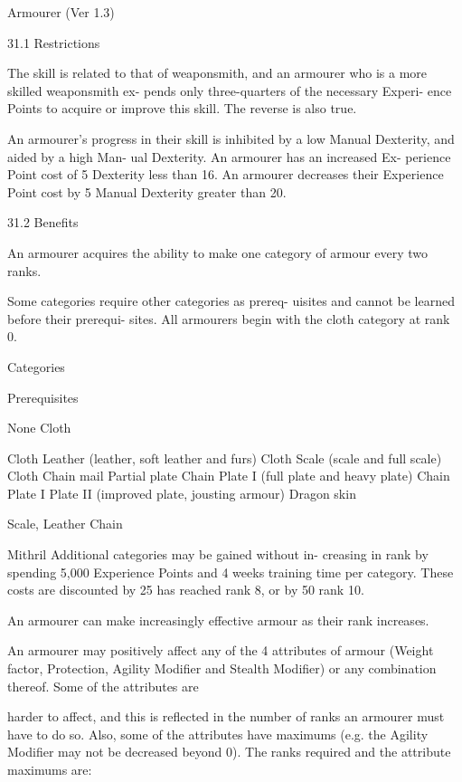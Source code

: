 \begin{Chapter}{Armourer (Ver 1.3)}

31.1 Restrictions 

The skill is related to that of weaponsmith, and an 
armourer  who  is  a  more  skilled  weaponsmith  ex-
pends  only  three-quarters  of  the  necessary  Experi-
ence  Points  to  acquire  or  improve  this  skill.  The 
reverse is also true. 

An armourer’s progress in their skill is inhibited by 
a low Manual Dexterity, and aided by a high Man-
ual  Dexterity.  An  armourer  has  an  increased  Ex-
perience Point cost of 5%
Dexterity less than 16. An armourer decreases their 
Experience  Point  cost  by  5%
Manual Dexterity greater than 20. 

31.2 Benefits 

An  armourer  acquires  the  ability  to  make  one 
category of armour every two ranks. 

Some categories require other categories as prereq-
uisites and cannot be learned before their prerequi-
sites.  All  armourers  begin  with  the  cloth  category 
at rank 0. 

Categories 

Prerequisites 

None  
Cloth  

Cloth 
Leather (leather, soft leather and 
furs) 
Cloth  
Scale (scale and full scale) 
Cloth  
Chain mail 
Partial plate 
Chain  
Plate I (full plate and heavy plate)  Chain  
Plate I 
Plate II (improved plate, jousting 
armour) 
Dragon skin 

Scale, 
Leather 
Chain 

Mithril 
Additional  categories  may  be  gained  without  in-
creasing  in  rank  by  spending  5,000  Experience 
Points  and  4  weeks  training  time  per  category. 
These costs are discounted by 25%
has reached rank 8, or by 50%
rank 10. 

An  armourer  can  make  increasingly  effective 
armour as their rank increases. 

An  armourer  may  positively  affect  any  of  the  4 
attributes  of  armour  (Weight  factor,  Protection, 
Agility  Modifier  and  Stealth  Modifier)  or  any 
combination  thereof.  Some  of  the  attributes  are 

harder to affect, and this is reflected in the number 
of  ranks  an  armourer  must  have  to  do  so.  Also, 
some  of  the  attributes  have  maximums  (e.g.  the 
Agility  Modifier  may  not be  decreased  beyond  0). 
The  ranks  required  and  the  attribute  maximums 
are: 


\end{Chapter}
